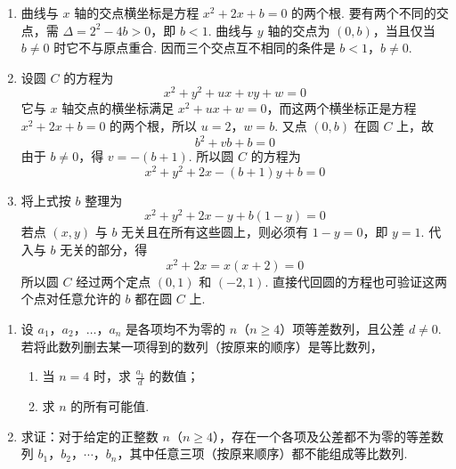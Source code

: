 \begin{solution}
\begin{enumerate}
\item 曲线与 \(x\) 轴的交点横坐标是方程 \(x^2+2x+b=0\) 的两个根. 要有两个不同的交点，需
\(\Delta=2^2-4b>0\)，即 \(b<1\). 曲线与 \(y\) 轴的交点为 \((0,b)\)，当且仅当 \(b\neq0\) 时它不与原点重合. 因而三个交点互不相同的条件是
\(b<1\)，\(b\neq0\).

\item 设圆 \(C\) 的方程为
\[
x^2+y^2+ux+vy+w=0
\]
它与 \(x\) 轴交点的横坐标满足 \(x^2+ux+w=0\)，而这两个横坐标正是方程 \(x^2+2x+b=0\) 的两个根，所以 \(u=2\)，\(w=b\). 又点 \((0,b)\) 在圆 \(C\) 上，故
\[
b^2+vb+b=0
\]
由于 \(b\neq0\)，得 \(v=-(b+1)\). 所以圆 \(C\) 的方程为
\[
x^2+y^2+2x-(b+1)y+b=0
\]

\item 将上式按 \(b\) 整理为
\[
x^2+y^2+2x-y+b(1-y)=0
\]
若点 \((x,y)\) 与 \(b\) 无关且在所有这些圆上，则必须有 \(1-y=0\)，即 \(y=1\). 代入与 \(b\) 无关的部分，得
\[
x^2+2x=x(x+2)=0
\]
所以圆 \(C\) 经过两个定点 \((0,1)\) 和 \((-2,1)\). 直接代回圆的方程也可验证这两个点对任意允许的 \(b\) 都在圆 \(C\) 上.
\end{enumerate}
\end{solution}

\begin{problem}
\begin{enumerate}
\item 设 \(a_1\)，\(a_2\)，\(\ldots\)，\(a_n\) 是各项均不为零的 \(n\)（\(n \geqslant 4\)）项等差数列，且公差 \(d \neq 0\). 若将此数列删去某一项得到的数列（按原来的顺序）是等比数列，
\begin{enumerate}
\item 当 \(n = 4\) 时，求 \(\frac{a_1}{d}\) 的数值；
\item 求 \(n\) 的所有可能值.
\end{enumerate}
\item 求证：对于给定的正整数 \(n\)（\(n \geqslant 4\)），存在一个各项及公差都不为零的等差数列 \(b_1\)，\(b_2\)，\(\cdots\)，\(b_n\)，其中任意三项（按原来顺序）都不能组成等比数列.
\end{enumerate}
\end{problem}

